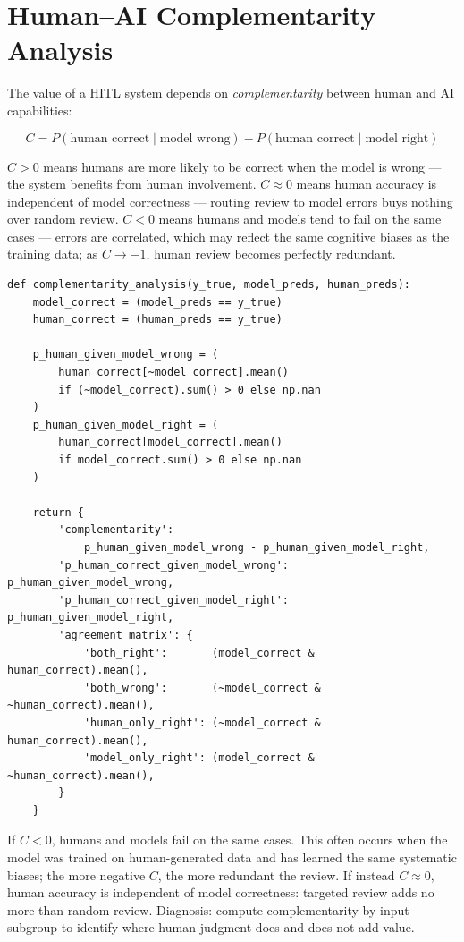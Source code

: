 \section{Human--AI Complementarity Analysis}

The value of a HITL system depends on \emph{complementarity} between human and AI capabilities:

\[
C = P(\text{human correct} \mid \text{model wrong})
  - P(\text{human correct} \mid \text{model right})
\]

$C > 0$ means humans are more likely to be correct when the model is wrong --- the system benefits from human involvement. $C \approx 0$ means human accuracy is independent of model correctness --- routing review to model errors buys nothing over random review. $C < 0$ means humans and models tend to fail on the same cases --- errors are correlated, which may reflect the same cognitive biases as the training data; as $C \to -1$, human review becomes perfectly redundant.

\begin{lstlisting}[style=python, caption={Complementarity analysis}]
def complementarity_analysis(y_true, model_preds, human_preds):
    model_correct = (model_preds == y_true)
    human_correct = (human_preds == y_true)

    p_human_given_model_wrong = (
        human_correct[~model_correct].mean()
        if (~model_correct).sum() > 0 else np.nan
    )
    p_human_given_model_right = (
        human_correct[model_correct].mean()
        if model_correct.sum() > 0 else np.nan
    )

    return {
        'complementarity':
            p_human_given_model_wrong - p_human_given_model_right,
        'p_human_correct_given_model_wrong': p_human_given_model_wrong,
        'p_human_correct_given_model_right': p_human_given_model_right,
        'agreement_matrix': {
            'both_right':       (model_correct & human_correct).mean(),
            'both_wrong':       (~model_correct & ~human_correct).mean(),
            'human_only_right': (~model_correct & human_correct).mean(),
            'model_only_right': (model_correct & ~human_correct).mean(),
        }
    }
\end{lstlisting}

\begin{cautionbox}
If $C < 0$, humans and models fail on the same cases. This often occurs when the model was trained on human-generated data and has learned the same systematic biases; the more negative $C$, the more redundant the review. If instead $C \approx 0$, human accuracy is independent of model correctness: targeted review adds no more than random review. Diagnosis: compute complementarity by input subgroup to identify where human judgment does and does not add value.
\end{cautionbox}

